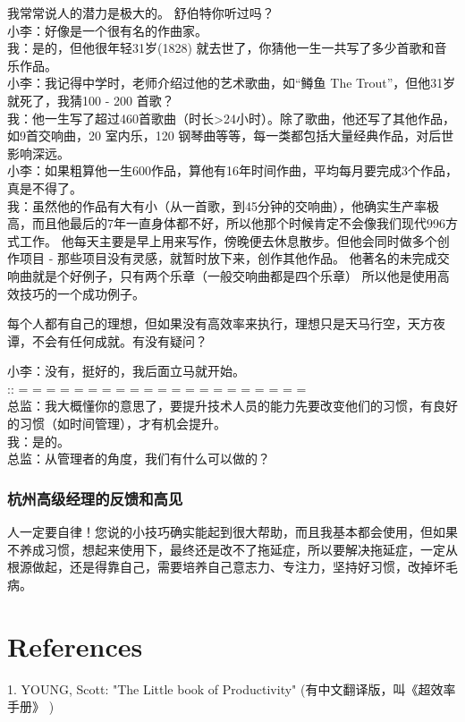 我常常说人的潜力是极大的。 舒伯特你听过吗？\\
小李：好像是一个很有名的作曲家。\\
我：是的，但他很年轻31岁(1828)
就去世了，你猜他一生一共写了多少首歌和音乐作品。\\
小李：我记得中学时，老师介绍过他的艺术歌曲，如``鳟鱼 The
Trout''，但他31岁就死了，我猜100 - 200 首歌？\\
我：他一生写了超过460首歌曲（时长\textgreater{}24小时）。除了歌曲，他还写了其他作品，如9首交响曲，20
室内乐，120 钢琴曲等等，每一类都包括大量经典作品，对后世影响深远。\\
小李：如果粗算他一生600作品，算他有16年时间作曲，平均每月要完成3个作品，真是不得了。\\
我：虽然他的作品有大有小（从一首歌，到45分钟的交响曲），他确实生产率极高，而且他最后的7年一直身体都不好，所以他那个时候肯定不会像我们现代996方式工作。
他每天主要是早上用来写作，傍晚便去休息散步。但他会同时做多个创作项目 -
那些项目没有灵感，就暂时放下来，创作其他作品。
他著名的未完成交响曲就是个好例子，只有两个乐章（一般交响曲都是四个乐章）
所以他是使用高效技巧的一个成功例子。

每个人都有自己的理想，但如果没有高效率来执行，理想只是天马行空，天方夜谭，不会有任何成就。有没有疑问？

小李：没有，挺好的，我后面立马就开始。\\
:: = = = = = = = = = = = = = = = = = = = = =\\
总监：我大概懂你的意思了，要提升技术人员的能力先要改变他们的习惯，有良好的习惯（如时间管理），才有机会提升。\\
我：是的。\\
总监：从管理者的角度，我们有什么可以做的？\\


\hypertarget{ux676dux5ddeux9ad8ux7ea7ux7ecfux7406ux7684ux53cdux9988ux548cux9ad8ux89c1}{%
\subsubsection{杭州高级经理的反馈和高见}\label{ux676dux5ddeux9ad8ux7ea7ux7ecfux7406ux7684ux53cdux9988ux548cux9ad8ux89c1}}

人一定要自律！您说的小技巧确实能起到很大帮助，而且我基本都会使用，但如果不养成习惯，想起来使用下，最终还是改不了拖延症，所以要解决拖延症，一定从根源做起，还是得靠自己，需要培养自己意志力、专注力，坚持好习惯，改掉坏毛病。

\hypertarget{references}{%
\section{References}\label{references}}


1. YOUNG, Scott: "The Little book of Productivity"
(有中文翻译版，叫《超效率手册》 )\\


